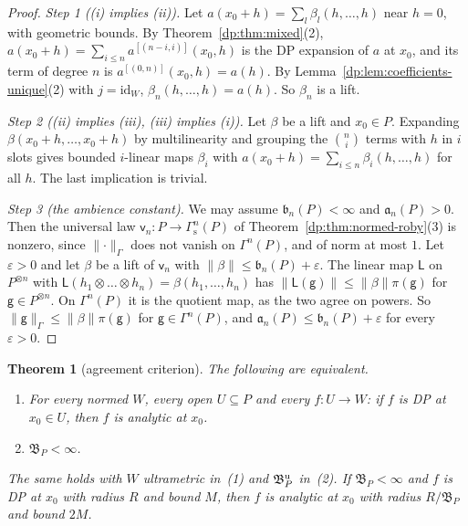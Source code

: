 \documentclass[11pt]{amsart}
\newtheorem{theorem}{Theorem}[section]
\theoremstyle{definition}
\theoremstyle{remark}
\numberwithin{equation}{section}
\newcommand{\id}{\mathrm{id}}
\newcommand{\norm}[1]{\lVert #1\rVert}
\theoremstyle{plain}
\theoremstyle{definition}
\theoremstyle{plain}
\begin{document}
\begin{proof}
\emph{Step 1 ((i) implies (ii)).} Let $a(x_0+h)=\sum_l\beta_l(h,\dots,h)$ near $h=0$, with geometric bounds. By Theorem~\ref{dp:thm:mixed}(2), $a(x_0+h)=\sum_{i\le n}a^{[(n-i,i)]}(x_0,h)$ is the DP expansion of $a$ at $x_0$, and its term of degree $n$ is $a^{[(0,n)]}(x_0,h)=a(h)$. By Lemma~\ref{dp:lem:coefficients-unique}(2) with $j=\id_W$, $\beta_n(h,\dots,h)=a(h)$. So $\beta_n$ is a lift.

\emph{Step 2 ((ii) implies (iii), (iii) implies (i)).} Let $\beta$ be a lift and $x_0\in P$. Expanding $\beta(x_0+h,\dots,x_0+h)$ by multilinearity and grouping the $\binom ni$ terms with $h$ in $i$ slots gives bounded $i$\nobreakdash-linear maps $\beta_i$ with $a(x_0+h)=\sum_{i\le n}\beta_i(h,\dots,h)$ for all $h$. The last implication is trivial.

\emph{Step 3 (the ambience constant).} We may assume $\mathfrak b_n(P)<\infty$ and $\mathfrak a_n(P)>0$. Then the universal law $\mathsf v_n\colon P\to\Gamma^n_{\mathrm s}(P)$ of Theorem~\ref{dp:thm:normed-roby}(3) is nonzero, since $\norm\cdot_\Gamma$ does not vanish on $\Gamma^n(P)$, and of norm at most $1$. Let $\varepsilon>0$ and let $\beta$ be a lift of $\mathsf v_n$ with $\norm\beta\le\mathfrak b_n(P)+\varepsilon$. The linear map $\mathsf L$ on $P^{\otimes n}$ with $\mathsf L(h_1\otimes\dots\otimes h_n)=\beta(h_1,\dots,h_n)$ has $\norm{\mathsf L(\mathsf g)}\le\norm\beta\pi(\mathsf g)$ for $\mathsf g\in P^{\otimes n}$. On $\Gamma^n(P)$ it is the quotient map, as the two agree on powers. So $\norm{\mathsf g}_\Gamma\le\norm\beta\pi(\mathsf g)$ for $\mathsf g\in\Gamma^n(P)$, and $\mathfrak a_n(P)\le\mathfrak b_n(P)+\varepsilon$ for every $\varepsilon>0$.
\end{proof}

\begin{theorem}[agreement criterion]\label{dp:thm:agreement-criterion}
The following are equivalent.
\begin{enumerate}
\item For every normed $W$, every open $U\subseteq P$ and every $f\colon U\to W$: if $f$ is DP at $x_0\in U$, then $f$ is analytic at $x_0$.
\item $\mathfrak B_P<\infty$.
\end{enumerate}
The same holds with $W$ ultrametric in~\textup{(1)} and $\mathfrak B^{\rm u}_P$ in~\textup{(2)}. If $\mathfrak B_P<\infty$ and $f$ is DP at $x_0$ with radius $R$ and bound $M$, then $f$ is analytic at $x_0$ with radius $R/\mathfrak B_P$ and bound $2M$.
\end{theorem}
\end{document}

